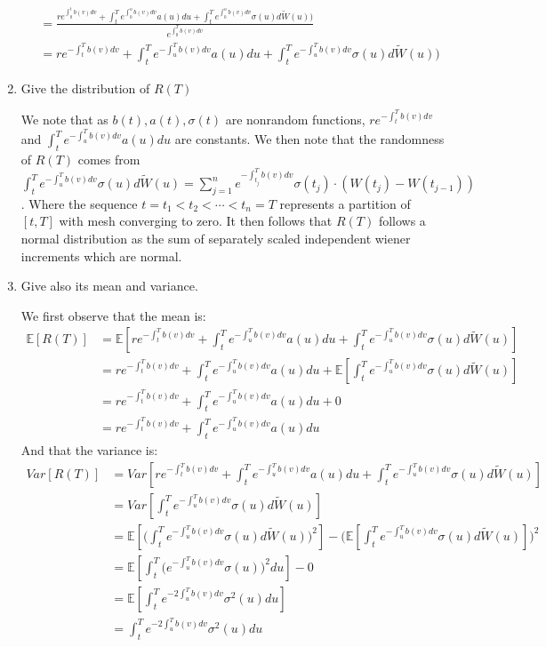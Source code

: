 \documentclass[12pt,twoside, letter]{exam}
\theoremstyle{definition}
\newcommand{\ee}{\mathbb{E}}
\begin{document}
\begin{enumerate}
\begin{solution}
\begin{align*}
          &= \frac{re^{\int^t_0 b(v) dv} + \int^T_t e^{\int^u_0 b(v) dv}a(u)du + \int^T_t e^{\int^u_0 b(v) dv}\sigma(u) d\tilde{W}(u))}{e^{\int^T_0 b(v) dv}} \\
          &= re^{-\int^T_t b(v) dv} + \int^T_t e^{-\int^T_u b(v) dv}a(u)du + \int^T_t e^{-\int^T_u b(v) dv}\sigma(u) d\tilde{W}(u))
        \end{align*}
      \end{solution}
    \item Give the distribution of $R(T)$
      \begin{solution}
        We note that as $b(t), a(t), \sigma(t)$ are nonrandom functions, $re^{-\int^T_t b(v) dv}$ and $\int^T_t e^{-\int^T_u b(v) dv}a(u)du$ are constants. We then note that
        the randomness of $R(T)$ comes from $\int^T_t e^{-\int^T_u b(v) dv}\sigma(u) d\tilde{W}(u) = \sum^n_{j=1} e^{-\int^T_{t_{j}} b(v) dv} \sigma(t_{j})\cdot (W(t_{j}) - W(t_{j-1}))$.
        Where the sequence $t = t_1 < t_2 < \cdots < t_n = T$ represents a partition of $[t, T]$ with mesh converging to zero.
        It then follows that $R(T)$ follows a normal distribution as the sum of separately scaled independent wiener increments which are normal.
      \end{solution}
    \item Give also its mean and variance.
      \begin{solution}
        We first observe that the mean is:
        \begin{align*}
          \ee[R(T)] &= \ee[re^{-\int^T_t b(v) dv} + \int^T_t e^{-\int^T_u b(v) dv}a(u)du + \int^T_t e^{-\int^T_u b(v) dv}\sigma(u) d\tilde{W}(u)] \\
          &= re^{-\int^T_t b(v) dv} + \int^T_t e^{-\int^T_u b(v) dv}a(u)du + \ee[\int^T_t e^{-\int^T_u b(v) dv}\sigma(u) d\tilde{W}(u)] \\
          &= re^{-\int^T_t b(v) dv} + \int^T_t e^{-\int^T_u b(v) dv}a(u)du + 0 \\
          &= re^{-\int^T_t b(v) dv} + \int^T_t e^{-\int^T_u b(v) dv}a(u)du
        \end{align*}
        And that the variance is:
        \begin{align*}
          Var[R(T)] &=  Var[re^{-\int^T_t b(v) dv} + \int^T_t e^{-\int^T_u b(v) dv}a(u)du + \int^T_t e^{-\int^T_u b(v) dv}\sigma(u) d\tilde{W}(u)] \\
          &= Var[\int^T_t e^{-\int^T_u b(v) dv}\sigma(u) d\tilde{W}(u)] \\
          &= \ee[\big(\int^T_t e^{-\int^T_u b(v) dv}\sigma(u) d\tilde{W}(u)\big)^2] - \bigg(\ee[\int^T_t e^{-\int^T_u b(v) dv}\sigma(u) d\tilde{W}(u)]\bigg)^2 \\
          &= \ee[\int^T_t \big(e^{-\int^T_u b(v) dv}\sigma(u)\big)^2 du] - 0 \\
          &= \ee[\int^T_t e^{-2\int^T_u b(v) dv}\sigma^2(u) du] \\
          &= \int^T_t e^{-2\int^T_u b(v) dv}\sigma^2(u) du
        \end{align*}
      \end{solution}
  \end{enumerate}
\end{document}
